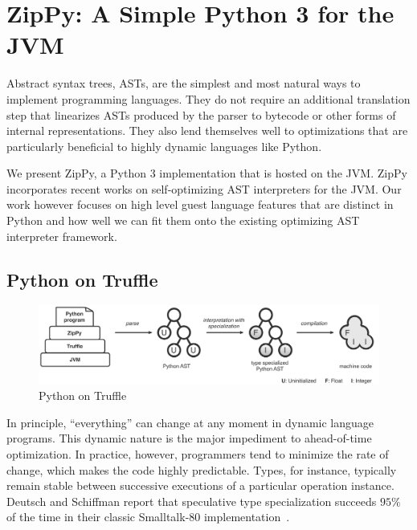 \chapter{ZipPy: A Simple Python 3 for the JVM}
\label{chp:ch3-zippy}

Abstract syntax trees, ASTs, are the simplest and most natural ways to implement programming languages.
They do not require an additional translation step that linearizes ASTs produced by the parser to bytecode or other forms of internal representations.
They also lend themselves well to optimizations that are particularly beneficial to highly dynamic languages like Python.

We present ZipPy, a Python 3 implementation that is hosted on the JVM.
ZipPy incorporates recent works on self-optimizing AST interpreters for the JVM.
Our work however focuses on high level guest language features that are distinct in Python and
how well we can fit them onto the existing optimizing AST interpreter framework.

\section{Python on Truffle}

\begin{figure}[t]
\centering
\includegraphics[scale=.6]{figures/ch3-python-on-truffle.pdf}
\caption{Python on Truffle}
\label{fig:python-on-truffle}
\end{figure}

In principle, ``everything'' can change at any moment in dynamic language programs.
This dynamic nature is the major impediment to ahead-of-time optimization.
In practice, however, programmers tend to minimize the rate of change, which makes the code highly predictable.
Types, for instance, typically remain stable between successive executions of a particular operation instance.
Deutsch and Schiffman report that speculative type specialization succeeds $95\%$ of the time in their classic Smalltalk-80 implementation~\cite{Deutsch1984}.


